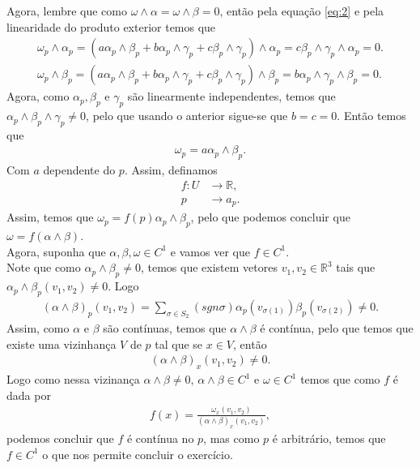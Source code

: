 \begin{homeworkProblem}[Seção 1-2]
\begin{solution}
    Agora, lembre que como $\omega\wedge\alpha=\omega\wedge\beta=0$, então pela equação \ref{eq:2} e pela linearidade do produto exterior temos que
    \begin{align*}
      \omega_p\wedge\alpha_p=(a\alpha_p\wedge\beta_p+b\alpha_p\wedge\gamma_p+c\beta_p\wedge\gamma_p)\wedge\alpha_p=c\beta_p\wedge\gamma_p\wedge\alpha_p=0.\\
      \omega_p\wedge\beta_p=(a\alpha_p\wedge\beta_p+b\alpha_p\wedge\gamma_p+c\beta_p\wedge\gamma_p)\wedge\beta_p=b\alpha_p\wedge\gamma_p\wedge\beta_p=0.
    \end{align*}
    Agora, como $\alpha_p,\beta_p$ e $\gamma_p$ são linearmente independentes, temos que $\alpha_p\wedge\beta_p\wedge\gamma_p\neq 0$, pelo que usando o anterior sigue-se que $b=c=0$. Então temos que
    \begin{align*}
      \omega_p=a\alpha_p\wedge\beta_p.
    \end{align*}
    Com $a$ dependente do $p$. Assim, definamos
    \begin{align*}
      f:U&\to\mathbb{R},\\
        p&\to a_p.
    \end{align*}
    Assim, temos que $\omega_p=f(p)\alpha_p\wedge\beta_p$, pelo que podemos concluir que $\omega=f(\alpha\wedge\beta)$.\\
    Agora, suponha que $\alpha,\beta,\omega\in C^{1}$ e vamos ver que $f\in C^{1}$.\\
    Note que como $\alpha_p\wedge\beta_p\neq 0$, temos que existem vetores $v_1,v_2\in\mathbb{R}^{3}$ tais que $\alpha_p\wedge\beta_p(v_1,v_2)\neq 0$. Logo
    \begin{align*}
      (\alpha\wedge\beta)_p(v_1,v_2)=\sum_{\sigma\in S_2}(sgn\sigma)\alpha_p(v_{\sigma(1)})\beta_p(v_{\sigma(2)})\neq 0.
    \end{align*}
    Assim, como $\alpha$ e $\beta$ são contínuas, temos que $\alpha\wedge\beta$ é contínua, pelo que temos que existe uma vizinhança $V$ de $p$ tal que se $x\in V$, então
    \begin{align*}
      (\alpha\wedge\beta)_x(v_1,v_2)\neq 0.
    \end{align*}
    Logo como nessa vizinança $\alpha\wedge\beta\neq 0$, $\alpha\wedge\beta\in C^{1}$ e $\omega\in C^{1}$ temos que como $f$ é dada por 
    \begin{align*}
      f(x)=\frac{\omega_x(v_1,v_2)}{(\alpha\wedge\beta)_{x}(v_1,v_2)},
    \end{align*}
    podemos concluir que $f$ é contínua no $p$, mas como $p$ é arbitrário, temos que $f\in C^1$ o que nos permite concluir o exercício.
  \end{solution}
\end{homeworkProblem}
